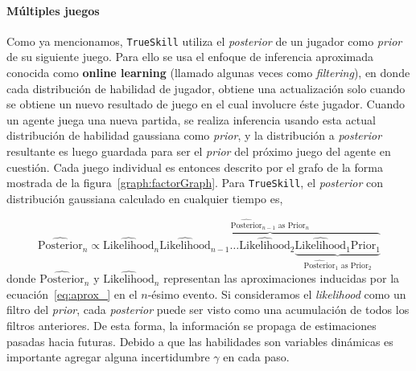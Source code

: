 \documentclass[11pt,twoside,spanish]{report} %
\begin{document}
\paragraph{M\'ultiples juegos}

Como ya mencionamos, \texttt{TrueSkill} utiliza el \textit{posterior} de un jugador como \textit{prior} de su siguiente juego.
Para ello se usa el enfoque de inferencia aproximada conocida como \textbf{online learning} (llamado algunas veces como \textit{filtering}), en donde cada distribuci\'on de habilidad de jugador, obtiene una actualizaci\'on solo cuando se obtiene un nuevo resultado de juego en el cual involucre \'este jugador.
Cuando un agente juega una nueva partida, se realiza inferencia usando esta actual distribuci\'on de habilidad gaussiana como \textit{prior}, y la distribuci\'on a \textit{posterior} resultante es luego guardada para ser el \textit{prior} del pr\'oximo juego del agente en cuesti\'on.
Cada juego individual es entonces descrito por el grafo de la forma mostrada de la figura~\ref{graph:factorGraph}.
Para \texttt{TrueSkill}, el \textit{posterior} con distribuci\'on gaussiana calculado en cualquier tiempo es,
 
\begin{equation}
 \widehat{\text{Posterior}}_n \propto \widehat{\text{Likelihood}}_n \overbrace{\widehat{\text{Likelihood}}_{n-1} \dots \widehat{\text{Likelihood}}_{2} \underbrace{\widehat{\text{Likelihood}}_{1} \text{Prior}_1}_{\widehat{\text{Posterior}}_{1} \text{ as } \text{Prior}_{2}} }^{\widehat{\text{Posterior}}_{n-1} \text{ as } \text{Prior}_{n}} 
\end{equation}
donde {\footnotesize $\widehat{\text{Posterior}}_n$} y {\footnotesize $\widehat{\text{Likelihood}}_n$} representan las aproximaciones inducidas por la ecuaci\'on~\ref{eq:aprox_} en el $n$-\'esimo evento.
Si consideramos el \textit{likelihood} como un filtro del \textit{prior}, cada \textit{posterior} puede ser visto como una acumulaci\'on de todos los filtros anteriores.
De esta forma, la informaci\'on se propaga de estimaciones pasadas hacia futuras.
Debido a que las habilidades son variables din\'amicas es importante agregar alguna incertidumbre $\gamma$ en cada paso.
\end{document}
